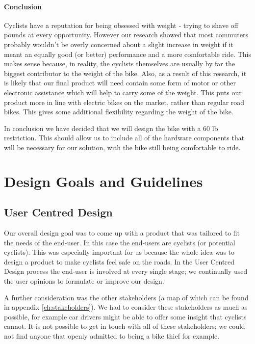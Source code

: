 \documentclass[a4paper]{report}
\begin{document}
\paragraph{Conclusion}
Cyclists have a reputation for being obsessed with weight - trying to shave off pounds at every opportunity. However our research showed that most commuters probably wouldn't be overly concerned about a slight increase in weight if it meant an equally good (or better) performance and a more comfortable ride. This makes sense because, in reality, the cyclists themselves are usually by far the biggest contributor to the weight of the bike. Also, as a result of this research, it is likely that our final product will need contain some form of motor or other electronic assistance which will help to carry some of the weight. This puts our product more in line with electric bikes on the market, rather than regular road bikes. This gives some additional flexibility regarding the weight of the bike.

In conclusion we have decided that we will design the bike with a 60 lb restriction. This should allow us to include all of the hardware components that will be necessary for our solution, with the bike still being comfortable to ride. 

\section{Design Goals and Guidelines}
\subsection{User Centred Design}
Our overall design goal was to come up with a product that was tailored to fit the needs of the end-user. In this case the end-users are cyclists (or potential cyclists). This was especially important for us because the whole idea was to design a product to make cyclists feel safe on the roads. In the User Centred Design process the end-user is involved at every single stage; we continually used the user opinions to formulate or improve our design.

A further consideration was the other stakeholders (a map of which can be found in appendix \ref{ch:stakeholders}). We had to consider these stakeholders as much as possible, for example car drivers might be able to offer some insight that cyclists cannot. It is not possible to get in touch with all of these stakeholders; we could not find anyone that openly admitted to being a bike thief for example.
\end{document}
